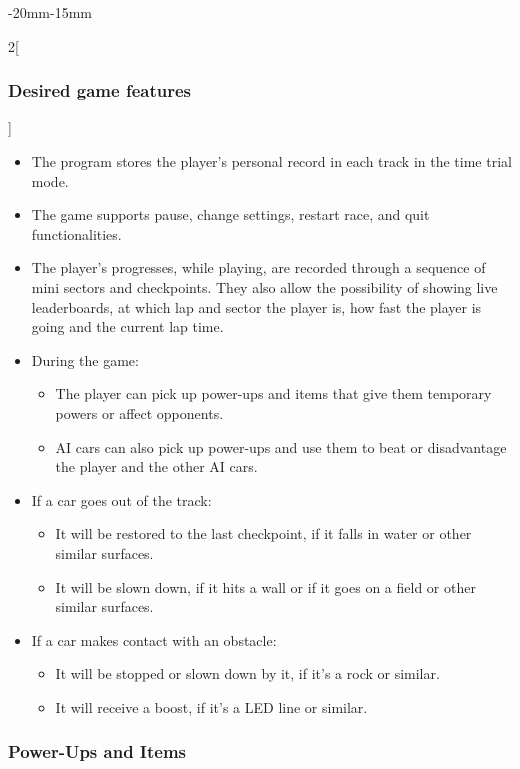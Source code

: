 \documentclass[12pt]{article}
\begin{document}
\begin{adjustwidth}{-20mm}{-15mm}
\begin{multicols}{2}[\subsubsection{Desired game features}]
\begin{itemize}
\item The program stores the player’s personal record in each track in the time trial mode.
\item The game supports pause, change settings, restart race, and quit functionalities.
\item The player’s progresses, while playing, are recorded through a sequence of mini sectors and checkpoints. They also allow the possibility of showing live leaderboards, at which lap and sector the player is, how fast the player is going and the current lap time.
\item During the game:
\begin{itemize}
\item The player can pick up power-ups and items that give them temporary powers or affect opponents.
\item AI cars can also pick up power-ups and use them to beat or disadvantage the player and the other AI cars.
\end{itemize}
\item If a car goes out of the track:
\begin{itemize}
\item It will be restored to the last checkpoint, if it falls in water or other similar surfaces.
\item It will be slown down, if it hits a wall or if it goes on a field or other similar surfaces.
\end{itemize}
\item If a car makes contact with an obstacle:
\begin{itemize}
\item It will be stopped or slown down by it, if it’s a rock or similar.
\item It will receive a boost, if it’s a LED line or similar.
\end{itemize}
\end{itemize}
\end{multicols}
\end{adjustwidth}

\subsubsection{Power-Ups and Items}
\end{document}
